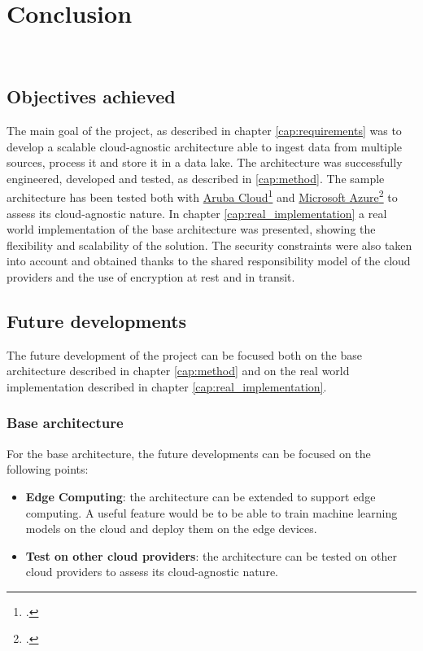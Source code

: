 \chapter{Conclusion}
\label{cap:conclusion}

\\

\section{Objectives achieved}
The main goal of the project, as described in chapter \ref{cap:requirements} was to develop a scalable cloud-agnostic architecture able to ingest data from multiple sources, process it and store it in a data lake. The architecture was successfully engineered, developed and tested, as described in \ref{cap:method}. The sample architecture has been tested both with \href{https://www.arubacloud.com/}{Aruba Cloud}\footcite{site:aruba-cloud} and \href{https://azure.microsoft.com/it-it/}{Microsoft Azure}\footcite{site:azure} to assess its cloud-agnostic nature.
In chapter \ref{cap:real_implementation} a real world implementation of the base architecture was presented, showing the flexibility and scalability of the solution. The security constraints were also taken into account and obtained thanks to the shared responsibility model of the cloud providers and the use of encryption at rest and in transit.\\

\section{Future developments}
The future development of the project can be focused both on the base architecture described in chapter \ref{cap:method} and on the real world implementation described in chapter \ref{cap:real_implementation}.

\subsection{Base architecture}
For the base architecture, the future developments can be focused on the following points:
\begin{itemize}
    \item \textbf{Edge Computing}: the architecture can be extended to support edge computing. A useful feature would be to be able to train machine learning models on the cloud and deploy them on the edge devices.
    \item \textbf{Test on other cloud providers}: the architecture can be tested on other cloud providers to assess its cloud-agnostic nature.
\end{itemize}




